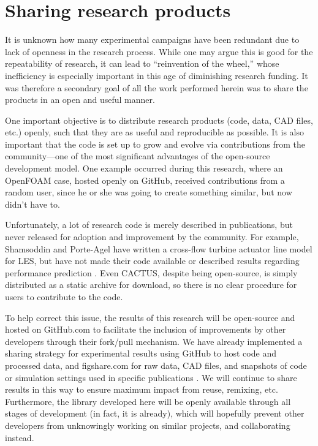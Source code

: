 \chapter{Sharing research products}
\doublespace

It is unknown how many experimental campaigns have been redundant due to lack of
openness in the research process. While one may argue this is good for the
repeatability of research, it can lead to ``reinvention of the wheel,'' whose
inefficiency is especially important in this age of diminishing research
funding. It was therefore a secondary goal of all the work performed herein was
to share the products in an open and useful manner.

One important objective is to distribute research products (code, data, CAD
files, etc.) openly, such that they are as useful and reproducible as possible.
It is also important that the code is set up to grow and evolve via
contributions from the community---one of the most significant advantages of the
open-source development model. One example occurred during this research, where
an OpenFOAM case, hosted openly on GitHub, received contributions from a random
user, since he or she was going to create something similar, but now didn't have
to.

Unfortunately, a lot of research code is merely described in publications, but
never released for adoption and improvement by the community. For example,
Shamsoddin and Porte-Agel have written a cross-flow turbine actuator line model
for LES, but have not made their code available or described results regarding
performance prediction \cite{Shamsoddin2014}. Even CACTUS, despite being
open-source, is simply distributed as a static archive for download, so there is
no clear procedure for users to contribute to the code.

To help correct this issue, the results of this research will be open-source and
hosted on GitHub.com to facilitate the inclusion of improvements by other
developers through their fork/pull mechanism. We have already implemented a
sharing strategy for experimental results using GitHub to host code and
processed data, and figshare.com for raw data, CAD files, and snapshots of code
or simulation settings used in specific publications
\cite{Bachant2014-RVAT-baseline, Bachant2014-RVAT-CAD,
Bachant2014-OF-AS-case-files, Bachant2015-RVAT-Re-dep-data}. We will continue to
share results in this way to ensure maximum impact from reuse, remixing, etc.
Furthermore, the library developed here will be openly available through all
stages of development (in fact, it is already), which will hopefully prevent
other developers from unknowingly working on similar projects, and collaborating
instead.


